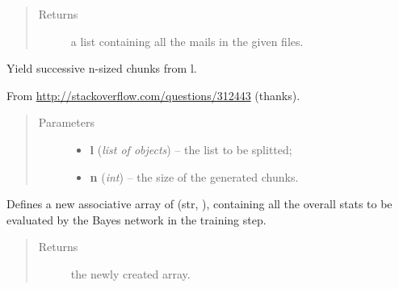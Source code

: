 \documentclass[letterpaper,10pt,english]{sphinxmanual}
\begin{document}
\begin{fulllineitems}
\begin{fulllineitems}
\begin{quote}
\begin{description}
\item[{Returns}] \leavevmode
a list containing all the mails in the given files.

\end{description}\end{quote}

\end{fulllineitems}


\begin{fulllineitems}
\label{index:utils.Utils.chunks}
Yield successive n-sized chunks from l.

From \href{http://stackoverflow.com/questions/312443}{http://stackoverflow.com/questions/312443} (thanks).
\begin{quote}\begin{description}
\item[{Parameters}] \leavevmode\begin{itemize}
\item {} 
\textbf{l} (\emph{list of objects}) -- the list to be splitted;

\item {} 
\textbf{n} (\emph{int}) -- the size of the generated chunks.

\end{itemize}

\end{description}\end{quote}

\end{fulllineitems}


\begin{fulllineitems}
\label{index:utils.Utils.create_stats}
Defines a new associative array of (str, {\hyperref[index:gen_stat.Stat]{}}),
containing all the overall stats to be evaluated by the Bayes network
in the training step.
\begin{quote}\begin{description}
\item[{Returns}] \leavevmode
the newly created array.

\end{description}\end{quote}


\end{fulllineitems}
\end{fulllineitems}
\end{document}
